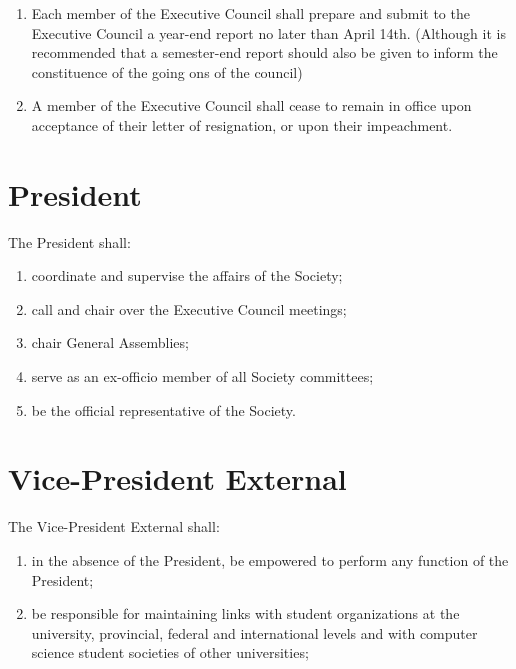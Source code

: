 \begin{enumerate}
\def\labelenumi{\arabic{enumi}.}
\setcounter{enumi}{2}
\item
  Each member of the Executive Council shall prepare and submit to the
  Executive Council a year-end report no later than April 14th.
  (Although it is recommended that a semester-end report should also be
  given to inform the constituence of the going ons of the council)
\item
  A member of the Executive Council shall cease to remain in office upon
  acceptance of their letter of resignation, or upon their impeachment.
\end{enumerate}

\section{President}\label{president}

The President shall:

\begin{enumerate}
\def\labelenumi{\arabic{enumi}.}
\item
  coordinate and supervise the affairs of the Society;
\item
  call and chair over the Executive Council meetings;
\item
  chair General Assemblies;
\item
  serve as an ex-officio member of all Society committees;
\item
  be the official representative of the Society.
\end{enumerate}

\section{Vice-President
External}\label{vice-president-external}

The Vice-President External shall:

\begin{enumerate}
\def\labelenumi{\arabic{enumi}.}
\item
  in the absence of the President, be empowered to perform any function
  of the President;
\item
  be responsible for maintaining links with student organizations at the
  university, provincial, federal and international levels and with
  computer science student societies of other universities;
\end{enumerate}

